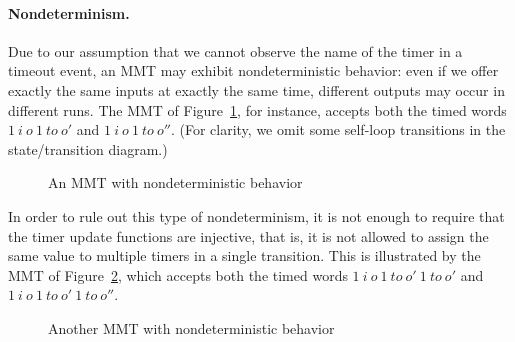 \paragraph{Nondeterminism.}
Due to our assumption that we cannot observe the name of the timer in a timeout event, an MMT may exhibit nondeterministic
behavior: even if we offer exactly the same inputs at exactly the same time, different outputs may occur in different runs. 
The MMT of Figure~\ref{fig:nondeterminism}, for instance, accepts both the timed words
$1 ~ i ~ o ~ 1 ~ \mathit{to} ~ o'$ and $1 ~ i ~ o ~ 1 ~ \mathit{to} ~ o''$.
(For clarity, we omit some self-loop transitions in the state/transition diagram.)
\begin{figure}[ht]
\begin{center}
\caption{An MMT with nondeterministic behavior}
\label{fig:nondeterminism}
\end{center}
\end{figure}
In order to rule out this type of nondeterminism, it is not enough to require that the timer update functions are injective,
that is, it is not allowed to assign the same value to multiple timers in a single transition.
This is illustrated by the MMT of Figure~\ref{fig:nondeterminism2}, which accepts both the timed words
$1 ~ i ~ o ~ 1 ~ \mathit{to} ~ o'~ 1 ~ \mathit{to} ~ o'$ and $1 ~ i ~ o ~ 1 ~ \mathit{to} ~ o' ~ 1 ~ \mathit{to} ~ o''$.
\begin{figure}[ht]
\begin{center}
\caption{Another MMT with nondeterministic behavior}
\label{fig:nondeterminism2}
\end{center}
\end{figure}


